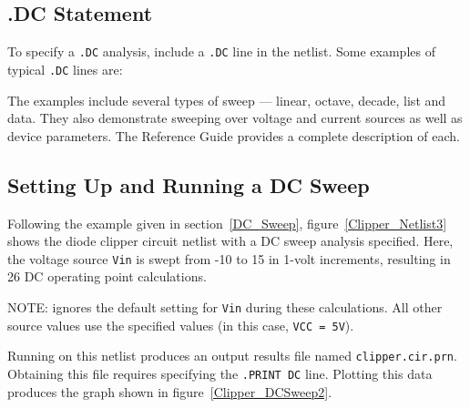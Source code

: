 \subsection{.DC Statement}

To specify a \verb|.DC| analysis, include a \verb|.DC| line in the netlist.  Some examples of typical \verb|.DC| lines are:


The examples include several types of sweep --- linear, octave,
decade, list and data.  They also demonstrate sweeping over voltage
and current sources as well as device parameters.  The \Xyce{}
Reference Guide\ReferenceGuide{} provides a complete description of
each.

\subsection{Setting Up and Running a DC Sweep}
\label{Running_DC_Sweep}

Following the example given in section~\ref{DC_Sweep},
figure~\ref{Clipper_Netlist3} shows the diode clipper circuit netlist
with a DC sweep analysis specified.  Here, the voltage source
\texttt{Vin} is swept from -10 to 15 in 1-volt increments, resulting
in 26 DC operating point calculations.

NOTE: \Xyce{} ignores the default setting for \texttt{Vin} during
these calculations.  All other source values use the specified values
(in this case, \texttt{VCC = 5V}).

Running \Xyce{} on this netlist produces an output results file named
\verb|clipper.cir.prn|.  Obtaining this file requires specifying the
\verb|.PRINT DC| line. Plotting this data produces the graph shown in
figure~\ref{Clipper_DCSweep2}.

